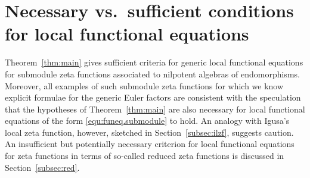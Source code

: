 \documentclass[11pt]{amsart}
\numberwithin{equation}{section}
\numberwithin{figure}{section}
\theoremstyle{plain}
\theoremstyle{definition}
\theoremstyle{remark}
\begin{document}
\section{Necessary vs.\ sufficient conditions for local functional equations}\label{sec:nec.vs.suff}
Theorem~\ref{thm:main} gives sufficient criteria for generic local
functional equations for submodule zeta functions associated to
nilpotent algebras of endomorphisms. Moreover, all examples of such
submodule zeta functions for which we know explicit formulae for the
generic Euler factors are consistent with the speculation that the
hypotheses of Theorem~\ref{thm:main} are also necessary for local
functional equations of the form \eqref{equ:funeq.submodule} to
hold. An analogy with Igusa's local zeta function, however, sketched
in Section~\ref{subsec:ilzf}, suggests caution. An insufficient but
potentially necessary criterion for local functional equations for
zeta functions in terms of so-called reduced zeta functions is
discussed in Section~\ref{subsec:red}.
\end{document}
